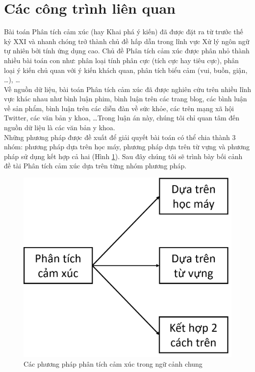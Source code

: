 \section{Các công trình liên quan}
Bài toán Phân tích cảm xúc (hay Khai phá ý kiến) đã được đặt ra từ trước thế kỷ XXI và nhanh chóng trở thành chủ đề hấp dẫn trong lĩnh vực Xử lý ngôn ngữ tự nhiên bởi tính ứng dụng cao. Chủ đề Phân tích cảm xúc được phân nhỏ thành nhiều bài toán con như: phân loại tính phân cực (tích cực hay tiêu cực), phân loại ý kiến chủ quan với ý kiến khách quan, phân tích biểu cảm (vui, buồn, giận, \ldots), \ldots\\

Về nguồn dữ liệu, bài toán Phân tích cảm xúc đã được nghiên cứu trên nhiều lĩnh vực khác nhau như bình luận phim, bình luận trên các trang blog, các bình luận về sản phẩm, bình luận trên các diễn đàn về sức khỏe, các  trên mạng xã hội Twitter, các văn bản y khoa, \ldots Trong luận án này, chúng tôi chỉ quan tâm đến nguồn dữ liệu là các văn bản y khoa.\\

Những phương pháp được đề xuất để giải quyết bài toán có thể chia thành 3 nhóm\cite{Silva2015}: phương pháp dựa trên học máy, phương pháp dựa trên từ vựng và phương pháp sử dụng kết hợp cả hai (Hình \ref{fig:cac-pp-phan-tich}). Sau đây chúng tôi sẽ trình bày bối cảnh đề tài Phân tích cảm xúc dựa trên từng nhóm phương pháp.
\begin{figure}
\centering
\includegraphics[scale=0.25]{../hinh/cac_pp_phan_tich.png}
\caption{Các phương pháp phân tích cảm xúc trong ngữ cảnh chung}
\label{fig:cac-pp-phan-tich}
\end{figure}
